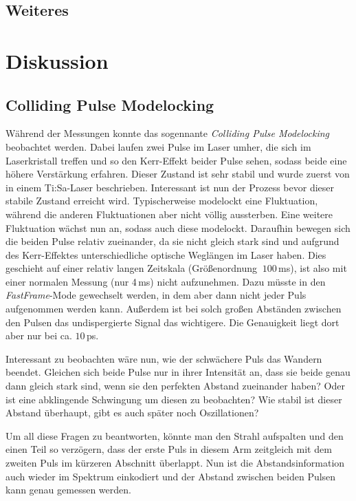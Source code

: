 \documentclass[bachelor,       %
               twoside,        %
               BCOR10mm,       %
               english,ngerman, %
               ]{GAUBM}
\begin{document}
\section{Weiteres}

\chapter{Diskussion}
\section{Colliding Pulse Modelocking}
\label{sec:cpml}
Während der Messungen konnte das sogennante \textit{Colliding Pulse Modelocking} beobachtet werden.
Dabei laufen zwei Pulse im Laser umher, die sich im Laserkristall treffen und so den Kerr-Effekt beider Pulse sehen, sodass beide eine höhere Verstärkung erfahren.
Dieser Zustand ist sehr stabil und wurde zuerst von \cite{lai_multiple_1997} in einem Ti:Sa-Laser beschrieben.
Interessant ist nun der Prozess bevor dieser stabile Zustand erreicht wird.
Typischerweise modelockt eine Fluktuation, während die anderen Fluktuationen aber nicht völlig aussterben.
Eine weitere Fluktuation wächst nun an, sodass auch diese modelockt.
Daraufhin bewegen sich die beiden Pulse relativ zueinander, da sie nicht gleich stark sind und aufgrund des Kerr-Effektes unterschiedliche optische Weglängen im Laser haben.
Dies geschieht auf einer relativ langen Zeitskala (Größenordnung $~100\,$ms), ist also mit einer normalen Messung (nur 4\,ms) nicht aufzunehmen.
Dazu müsste in den \textit{FastFrame}-Mode gewechselt werden, in dem aber dann nicht jeder Puls aufgenommen werden kann.
Außerdem ist bei solch großen Abständen zwischen den Pulsen das undispergierte Signal das wichtigere.
Die Genauigkeit liegt dort aber nur bei ca. $10\,$ps.

Interessant zu beobachten wäre nun, wie der schwächere Puls das Wandern beendet.
Gleichen sich beide Pulse nur in ihrer Intensität an, dass sie beide genau dann gleich stark sind, wenn sie den perfekten Abstand zueinander haben?
Oder ist eine abklingende Schwingung um diesen zu beobachten?
Wie stabil ist dieser Abstand überhaupt, gibt es auch später noch Oszillationen?

Um all diese Fragen zu beantworten, könnte man den Strahl aufspalten und den einen Teil so verzögern, dass der erste Puls in diesem Arm zeitgleich mit dem zweiten Puls im kürzeren Abschnitt überlappt.
Nun ist die Abstandsinformation auch wieder im Spektrum einkodiert und der Abstand zwischen beiden Pulsen kann genau gemessen werden.
\end{document}
